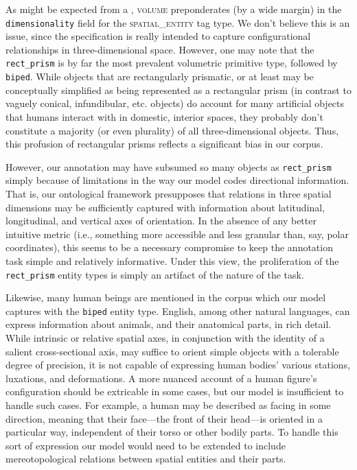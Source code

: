 \documentclass[11pt]{article}
\begin{document}
As might be expected from a , \textsc{volume} preponderates (by a wide margin) in the \texttt{dimensionality} field for the \textsc{spatial\_entity} tag type. We don't believe this is an issue, since the specification is really intended to capture configurational relationships in three-dimensional space. However, one may note that the \texttt{rect\_prism} is by far the most prevalent volumetric primitive type, followed by \texttt{biped}. While objects that are rectangularly prismatic, or at least may be conceptually simplified as being represented as a rectangular prism (in contrast to vaguely conical, infundibular, etc. objects) do account for many artificial objects that humans interact with in domestic, interior spaces, they probably don't constitute a majority (or even plurality) of all three-dimensional objects. Thus, this profusion of rectangular prisms reflects a significant bias in our corpus.

However, our annotation may have subsumed so many objects as \texttt{rect\_prism} simply because of limitations in the way our model codes directional information. That is, our ontological framework presupposes that relations in three spatial dimensions may be sufficiently captured with information about latitudinal, longitudinal, and vertical axes of orientation. In the absence of any better intuitive metric (i.e., something more accessible and less granular than, say, polar coordinates), this seems to be a necessary compromise to keep the annotation task simple and relatively informative. Under this view, the proliferation of the \texttt{rect\_prism} entity types is simply an artifact of the nature of the task.

Likewise, many human beings are mentioned in the corpus which our model captures with the \texttt{biped} entity type. English, among other natural languages, can express information about animals, and their anatomical parts, in rich detail. While intrinsic or relative spatial axes, in conjunction with the identity of a salient cross-sectional axis, may suffice to orient simple objects with a tolerable degree of precision, it is not capable of expressing human bodies' various stations, luxations, and deformations. A more nuanced account of a human figure's configuration should be extricable in some cases, but our model is insufficient to handle such cases. For example, a human may be described as facing in some direction, meaning that their face---the front of their head---is oriented in a particular way, independent of their torso or other bodily parts. To handle this sort of expression our model would need to be extended to include mereotopological relations between spatial entities and their parts.
\end{document}
